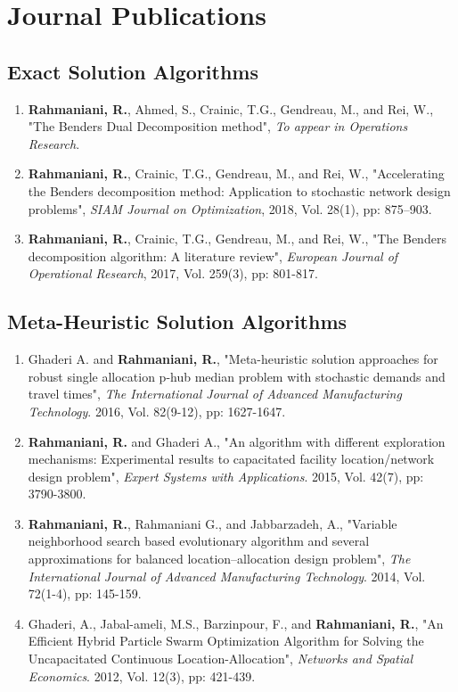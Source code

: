 \documentclass[10PT,letter]{article}
\newcommand{\subsectionstyle}[1]{\normalfont\selectfont\textcolor{titlecol}{\sffamily #1}}
\newcommand{\numbox}[1]{} %
\begin{document}
            

\section*{\numbox{3}\bfseries\textcolor{titlecol}{\sffamily Journal Publications }}       
        \subsection*{\subsectionstyle{Exact  Solution Algorithms}}
	        \begin{enumerate}[itemsep=.5mm]
					\item 
								\textbf{Rahmaniani, R.}, Ahmed, S., Crainic, T.G., Gendreau, M., and Rei, W., "The Benders Dual Decomposition method", \textit{To appear in Operations Research}.
					\item 
								\textbf{Rahmaniani, R.}, Crainic, T.G., Gendreau, M., and Rei, W., "Accelerating the Benders decomposition method: Application to stochastic network design problems", \textit{SIAM Journal on Optimization}, 2018, Vol. 28(1), pp: 875–903.
					\item
								 \textbf{Rahmaniani, R.}, Crainic, T.G., Gendreau, M., and Rei, W., "The Benders decomposition algorithm: A literature review", \textit{European Journal of Operational Research}, 2017, Vol. 259(3), pp: 801-817.
			\end{enumerate}
		\subsection*{\subsectionstyle{Meta-Heuristic  Solution Algorithms}}
			\begin{enumerate}[itemsep=.5mm]
				\item 
							Ghaderi A. and \textbf{Rahmaniani, R.}, "Meta-heuristic solution approaches for robust single allocation p-hub median problem with stochastic demands and travel times", \textit{The International Journal of Advanced Manufacturing Technology}. 2016, Vol. 82(9-12), pp: 1627-1647.
				\item 
							\textbf{Rahmaniani, R.} and Ghaderi A., "An algorithm with different exploration mechanisms: Experimental results to capacitated facility location/network design problem", \textit{Expert Systems with Applications}. 2015, Vol. 42(7), pp: 3790-3800.
				\item
							 \textbf{Rahmaniani, R.}, Rahmaniani G., and Jabbarzadeh, A., "Variable neighborhood search based evolutionary algorithm and several approximations for balanced location–allocation design problem", \textit{The International Journal of Advanced Manufacturing Technology}. 2014, Vol. 72(1-4), pp: 145-159.
				\item 
							Ghaderi, A., Jabal-ameli, M.S., Barzinpour, F., and \textbf{Rahmaniani, R.}, "An Efficient Hybrid Particle Swarm Optimization Algorithm for Solving the Uncapacitated Continuous Location-Allocation", \textit{Networks and Spatial Economics}. 2012, Vol. 12(3), pp: 421-439.
			\end{enumerate}
\end{document}
